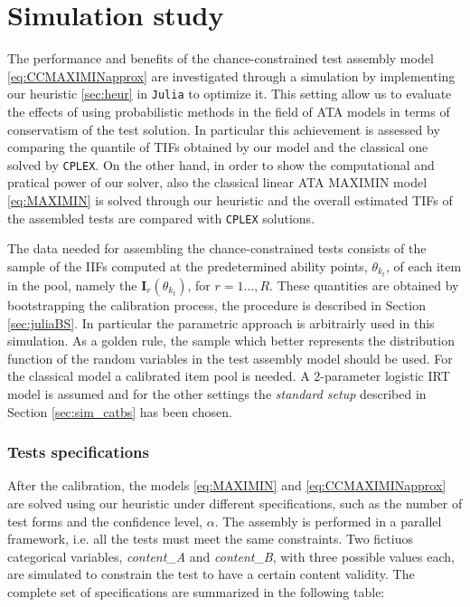 \section{Simulation study}

The performance and benefits of the chance-constrained test assembly model \eqref{eq:CCMAXIMINapprox} are investigated through a simulation by implementing our heuristic \ref{sec:heur} in \texttt{Julia} to optimize it. This setting allow us to evaluate the effects of using probabilistic methods in the field of ATA models in terms of conservatism of the test solution. In particular this achievement is assessed by comparing the quantile of TIFs obtained by our model and the classical one solved by \texttt{CPLEX}. On the other hand, in order to show the computational and pratical power of our solver, also the classical linear ATA MAXIMIN model \eqref{eq:MAXIMIN} is solved through our heuristic and the overall estimated TIFs of the assembled tests are compared with \texttt{CPLEX} solutions.

The data needed for assembling the chance-constrained tests consists of the sample of the IIFs computed at the predetermined ability points, $\theta_{k_t}$, of each item in the pool, namely the $\mathbf{I}_r(\theta_{k_t})$, for $r=1\ldots,R$. These quantities are obtained by bootstrapping the calibration process, the procedure is described in Section \ref{sec:juliaBS}. In particular the parametric approach is arbitrairly used in this simulation. As a golden rule, the sample which better represents the distribution function of the random variables in the test assembly model should be used. For the classical model a calibrated item pool is needed. A 2-parameter logistic IRT model is assumed and for the other settings the \emph{standard setup} described in Section \ref{sec:sim_catbs} has been chosen.
 
 \subsubsection{Tests specifications}
 
 After the calibration, the models \eqref{eq:MAXIMIN} and \eqref{eq:CCMAXIMINapprox} are solved using our heuristic under different specifications, such as the number of test forms and the confidence level, $\alpha$. The assembly is performed in a parallel framework, i.e. all the tests must meet the same constraints. Two fictiuos categorical variables, \emph{content\_A} and \emph{content\_B}, with three possible values each, are simulated to constrain the test to have a certain content validity. The complete set of specifications are summarized in the following table:
 \renewcommand{\arraystretch}{1.3}
 
